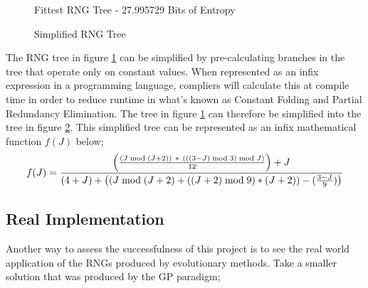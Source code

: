 \documentclass[a4paper,10.5pt]{article}
\begin{document}
\begin{figure}
\caption{Fittest RNG Tree - 27.995729 Bits  of Entropy}
\label{fulltree}
\end{figure}
\newpage
\begin{figure}
\label{simplifiedtree}
\caption{Simplified RNG Tree}
\end{figure}
The RNG tree in figure \ref{fulltree} can be simplified by pre-calculating branches in the tree that operate only on constant values. When represented as an infix expression in a programming language, compliers will calculate this at compile time in order to reduce runtime in what's known as Constant Folding and Partial Redundancy Elimination. The tree in figure \ref{fulltree} can therefore be simplified into the tree in figure \ref{simplifiedtree}. This simplified tree can be represented as an infix mathematical function $f(J)$ below;
\begin{equation*}
f(J) = {{\left( (J\bmod (J+2))\ *\ (((3-J)\bmod 3)\bmod J) \over 12 \right) + J} \over {(4 + J) + \left((J\bmod(J+2) + ((J+2)\bmod 9) * (J+2)) - ({3-J \over 9}) \right)}}
\end{equation*}

\subsection{Real Implementation}
Another way to assess the successfulness of this project is to see the real world application of the RNGs produced by evolutionary methods. Take a smaller solution that was produced by the GP paradigm;
\end{document}
